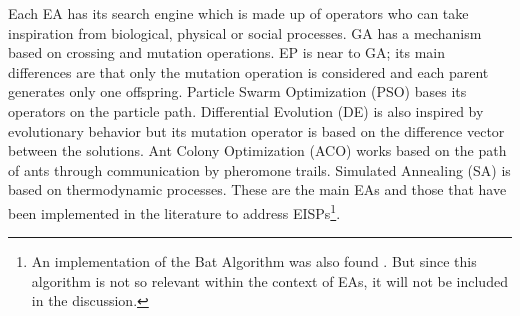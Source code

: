 			Each EA has its search engine which is made up of operators who can take inspiration from biological, physical or social processes. GA has a mechanism based on crossing and mutation operations. EP is near to GA; its main differences are that only the mutation operation is considered and each parent generates only one offspring. Particle Swarm Optimization (PSO) bases its operators on the particle path. Differential Evolution (DE) is also inspired by evolutionary behavior but its mutation operator is based on the difference vector between the solutions. Ant Colony Optimization (ACO) works based on the path of ants through communication by pheromone trails. Simulated Annealing (SA) is based on thermodynamic processes. These are the main EAs and those that have been implemented in the literature to address EISPs\footnote{An implementation of the Bat Algorithm was also found \citep{yang2021hybrid}. But since this algorithm is not so relevant within the context of EAs, it will not be included in the discussion.}.
			

